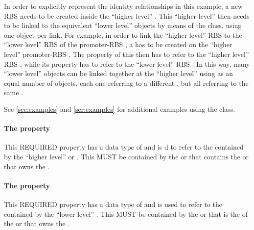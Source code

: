 In order to explicitly represent the identity relationships in this example, a new RBS  needs to be created inside the ``higher level'' .
This ``higher level''  then needs to be linked to the equivalent ``lower level''  objects by means of the  class, using one  object per link.
For example, in order to link the ``higher level'' RBS  to the ``lower level'' RBS  of the promoter-RBS , a  has to be created on the ``higher level'' promoter-RBS . The  property of this  then has to refer to the ``higher level'' RBS , while its  property has to refer to the ``lower level'' RBS .
In this way, many ``lower level''  objects can be linked together at the ``higher level'' using as an equal number of  objects, each one referring to a different  , but all referring to the same  .

See \ref{sec:examples} and \ref{ser:examples} for additional examples using the  class.

\paragraph{The  property}\label{sec:local}
This REQUIRED property has a data type of  and is 
d to refer to the  contained by the ``higher level''  or . This   MUST be contained by the  or  that contains the  or  that owns the .

\paragraph{The  property}\label{sec:remote}
This REQUIRED property has a data type of  and is used to refer to the  contained by the ``lower level'' .
This   MUST be contained by the  or  that is the  of the  or  that owns the .

